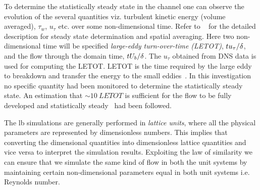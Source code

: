 To determine the statistically steady state in the channel one can observe the evolution of the several quantities viz. turbulent kinetic energy (volume averaged), $\tau_w$, $u_\tau$ etc. over some non-dimensional time. Refer to ~\cite{Jimandmoin:91} for the detailed description for steady state determination and spatial averaging. Here two non-dimensional time will be specified \emph{large-eddy turn-over-time (LETOT)}, $tu_\tau/\delta$, and the flow through the domain time, $tU_b/\delta$. The $u_\tau$ obtained from DNS data is used for computing the LETOT. LETOT is the time required by the large eddy to breakdown and transfer the energy to the small eddies~\cite{bespalko:11}. In this investigation no specific quantity had been monitored to determine the statistically steady state. An estimation that $\sim10\ LETOT$ is sufficient for the flow to be fully developed and statistically steady~\cite{mk} had been followed. 

The lb simulations are generally performed in \emph{lattice units}, where all the physical parameters are represented by dimensionless numbers. This implies that converting the dimensional quantities into dimensionless lattice quantities and vice versa to interpret the simulation results. Exploiting the law of similarity we can ensure that we simulate the same kind of flow in both the unit systems by maintaining certain non-dimensional parameters equal in both unit systems i.e. Reynolds number.
 
